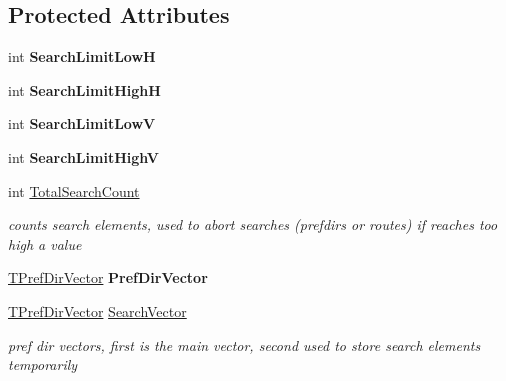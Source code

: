 \subsection*{Protected Attributes}
\begin{DoxyCompactItemize}
\item 
\mbox{\label{class_t_one_pref_dir_af33d48762fe2b104b75fca9a97d96252}} 
int {\bfseries Search\+Limit\+LowH}
\item 
\mbox{\label{class_t_one_pref_dir_a68677f0598c54c3e6e3c27075b23aa14}} 
int {\bfseries Search\+Limit\+HighH}
\item 
\mbox{\label{class_t_one_pref_dir_aa469479759bd4379bee3f938ad8bfd90}} 
int {\bfseries Search\+Limit\+LowV}
\item 
\mbox{\label{class_t_one_pref_dir_a2665c08fe2a230db10ded6e78975bc13}} 
int {\bfseries Search\+Limit\+HighV}
\item 
\mbox{\label{class_t_one_pref_dir_a8e982d8317ce1579b143adf74d88d692}} 
int \mbox{\hyperlink{class_t_one_pref_dir_a8e982d8317ce1579b143adf74d88d692}{Total\+Search\+Count}}
\begin{DoxyCompactList}\small\item\em counts search elements, used to abort searches (prefdirs or routes) if reaches too high a value \end{DoxyCompactList}\item 
\mbox{\label{class_t_one_pref_dir_ab2da871d689df7e78f430c5d354bb953}} 
\mbox{\hyperlink{class_t_one_pref_dir_a7162736e4bbe36fbac7a57ce395fcd14}{T\+Pref\+Dir\+Vector}} {\bfseries Pref\+Dir\+Vector}
\item 
\mbox{\label{class_t_one_pref_dir_a2d035366a044fc7d0e0a745762bd4664}} 
\mbox{\hyperlink{class_t_one_pref_dir_a7162736e4bbe36fbac7a57ce395fcd14}{T\+Pref\+Dir\+Vector}} \mbox{\hyperlink{class_t_one_pref_dir_a2d035366a044fc7d0e0a745762bd4664}{Search\+Vector}}
\begin{DoxyCompactList}\small\item\em pref dir vectors, first is the main vector, second used to store search elements temporarily \end{DoxyCompactList}\end{DoxyCompactItemize}

